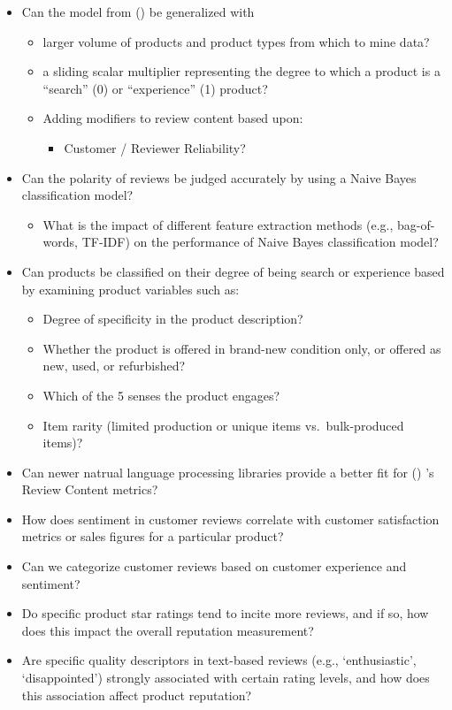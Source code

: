 \documentclass[
  letterpaper,
  DIV=11,
  numbers=noendperiod]{scrreprt}
\providecommand{\tightlist}{%
  \setlength{\itemsep}{0pt}\setlength{\parskip}{0pt}}\usepackage{longtable,booktabs,array}
\begin{document}
\begin{itemize}
\item
  Can the model from () be
  generalized with

  \begin{itemize}
  \item
    larger volume of products and product types from which to mine data?
  \item
    a sliding scalar multiplier representing the degree to which a
    product is a ``search'' (0) or ``experience'' (1) product?
  \item
    Adding modifiers to review content based upon:

    \begin{itemize}
    \tightlist
    \item
      Customer / Reviewer Reliability?
    \end{itemize}
  \end{itemize}
\item
  Can the polarity of reviews be judged accurately by using a Naive
  Bayes classification model?

  \begin{itemize}
  \tightlist
  \item
    What is the impact of different feature extraction methods (e.g.,
    bag-of-words, TF-IDF) on the performance of Naive Bayes
    classification model?
  \end{itemize}
\item
  Can products be classified on their degree of being search or
  experience based by examining product variables such as:

  \begin{itemize}
  \item
    Degree of specificity in the product description?
  \item
    Whether the product is offered in brand-new condition only, or
    offered as new, used, or refurbished?
  \item
    Which of the 5 senses the product engages?
  \item
    Item rarity (limited production or unique items vs.~bulk-produced
    items)?
  \end{itemize}
\item
  Can newer natrual language processing libraries provide a better fit
  for () 's Review Content
  metrics?
\item
  How does sentiment in customer reviews correlate with customer
  satisfaction metrics or sales figures for a particular product?
\item
  Can we categorize customer reviews based on customer experience and
  sentiment?
\item
  Do specific product star ratings tend to incite more reviews, and if
  so, how does this impact the overall reputation measurement?
\item
  Are specific quality descriptors in text-based reviews (e.g.,
  `enthusiastic', `disappointed') strongly associated with certain
  rating levels, and how does this association affect product
  reputation?
\end{itemize}
\end{document}
